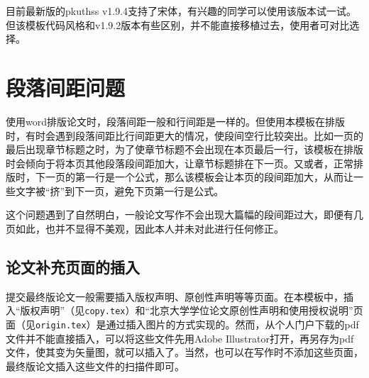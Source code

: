 目前最新版的pkuthss v1.9.4支持了宋体，有兴趣的同学可以使用该版本试一试。但该模板代码风格和v1.9.2版本有些区别，并不能直接移植过去，使用者可对比选择。

\section{段落间距问题}

使用word排版论文时，段落间距一般和行间距是一样的。但使用本模板在排版时，有时会遇到段落间距比行间距更大的情况，使段间空行比较突出。比如一页的最后出现章节标题之时，为了使章节标题不会出现在本页最后一行，该模板在排版时会倾向于将本页其他段落段间距加大，让章节标题排在下一页。又或者，正常排版时，下一页的第一行是一个公式，那么该模板会让本页的段间距加大，从而让一些文字被“挤”到下一页，避免下页第一行是公式。

这个问题遇到了自然明白，一般论文写作不会出现大篇幅的段间距过大，即便有几页如此，也并不显得不美观，因此本人并未对此进行任何修正。

\subsection{论文补充页面的插入}

提交最终版论文一般需要插入版权声明、原创性声明等等页面。在本模板中，插入“版权声明”（见\texttt{copy.tex}）和“北京大学学位论文原创性声明和使用授权说明”页面（见\texttt{origin.tex}）是通过插入图片的方式实现的。然而，从个人门户下载的pdf文件并不能直接插入，可以将这些文件先用Adobe Illustrator打开，再另存为pdf文件，使其变为矢量图，就可以插入了。当然，也可以在写作时不添加这些页面，最终版论文插入这些文件的扫描件即可。